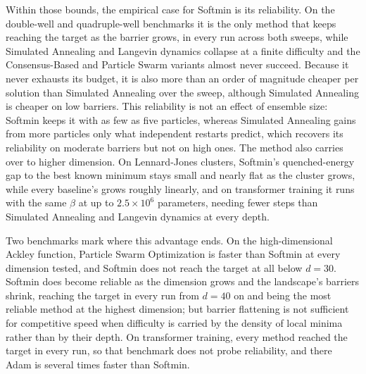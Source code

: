 \documentclass{article}
\theoremstyle{plain}
\theoremstyle{definition}
\theoremstyle{remark}
\begin{document}
Within those bounds, the empirical case for Softmin is its reliability. On the double-well and quadruple-well benchmarks it is the only method that keeps reaching the target as the barrier grows, in every run across both sweeps, while Simulated Annealing and Langevin dynamics collapse at a finite difficulty and the Consensus-Based and Particle Swarm variants almost never succeed. Because it never exhausts its budget, it is also more than an order of magnitude cheaper per solution than Simulated Annealing over the sweep, although Simulated Annealing is cheaper on low barriers. This reliability is not an effect of ensemble size: Softmin keeps it with as few as five particles, whereas Simulated Annealing gains from more particles only what independent restarts predict, which recovers its reliability on moderate barriers but not on high ones. The method also carries over to higher dimension. On Lennard-Jones clusters, Softmin's quenched-energy gap to the best known minimum stays small and nearly flat as the cluster grows, while every baseline's grows roughly linearly, and on transformer training it runs with the same $\beta$ at up to $2.5\times10^6$ parameters, needing fewer steps than Simulated Annealing and Langevin dynamics at every depth.

Two benchmarks mark where this advantage ends. On the high-dimensional Ackley function, Particle Swarm Optimization is faster than Softmin at every dimension tested, and Softmin does not reach the target at all below $d=30$. Softmin does become reliable as the dimension grows and the landscape's barriers shrink, reaching the target in every run from $d=40$ on and being the most reliable method at the highest dimension; but barrier flattening is not sufficient for competitive speed when difficulty is carried by the density of local minima rather than by their depth. On transformer training, every method reached the target in every run, so that benchmark does not probe reliability, and there Adam is several times faster than Softmin.
\end{document}
